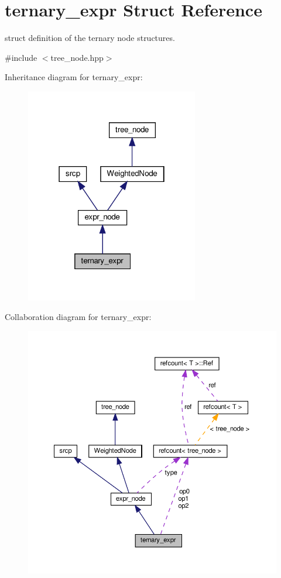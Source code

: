 \hypertarget{structternary__expr}{}\section{ternary\+\_\+expr Struct Reference}
\label{structternary__expr}


struct definition of the ternary node structures.  




{\ttfamily \#include $<$tree\+\_\+node.\+hpp$>$}



Inheritance diagram for ternary\+\_\+expr\+:
\nopagebreak
\begin{figure}[H]
\begin{center}
\leavevmode
\includegraphics[width=214pt]{d4/d9c/structternary__expr__inherit__graph}
\end{center}
\end{figure}


Collaboration diagram for ternary\+\_\+expr\+:
\nopagebreak
\begin{figure}[H]
\begin{center}
\leavevmode
\includegraphics[width=350pt]{d2/d20/structternary__expr__coll__graph}
\end{center}
\end{figure}

